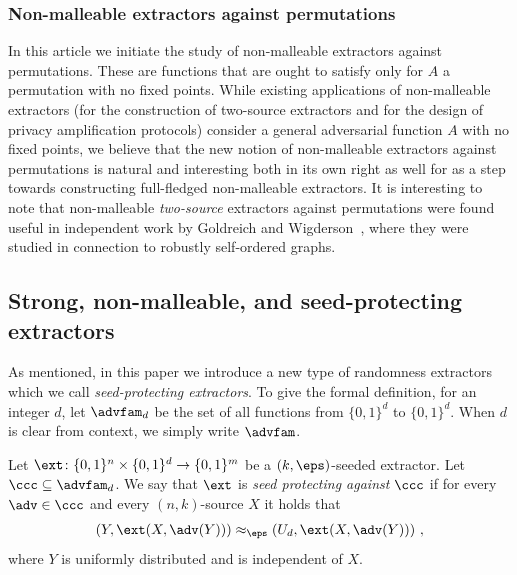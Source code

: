 %
%
\subsubsection{Non-malleable extractors against permutations}
%
In this %
article  %
we initiate the study of non-malleable extractors against permutations. These are functions that are ought to satisfy  only for  $A$ a permutation with no fixed points. While existing applications of non-malleable extractors (for the construction of %
two-source   %
extractors and for the design of privacy amplification protocols) consider a general adversarial function $A$ with no fixed points, we believe that the new notion of non-malleable extractors against permutations is natural and interesting both in its own right as well for as a step towards constructing full-fledged non-malleable extractors.
It is interesting to note that non-malleable \emph{two-source} extractors against permutations were found useful in
%
independent work  %
by Goldreich and Wigderson~\cite{GW21}, where they
were studied in connection to robustly self-ordered graphs.

\subsection{Strong, non-malleable, and seed-protecting extractors}\label{sec:snsp}
As mentioned, in this %
paper  %
we introduce a new type of randomness extractors which we call \emph{seed-protecting extractors}. To give the formal definition, for an integer $d$, let $\advfam_d$ be the set of all functions from $\{0,1\}^d$ to $\{0,1\}^d$. When $d$ is clear from context, we simply write $\advfam$.%

\begin{definition}\label{def:sp intro}
	Let $\ext \colon \{0,1\}^n \times \{0,1\}^d \to \{0,1\}^m$ be a $(k,\eps)$-seeded extractor. Let $\ccc \subseteq \advfam_d$. We say that $\ext$ is \emph{seed protecting against $\ccc$} if for every $\adv \in \ccc$ and every $(n,k)$-source $X$ it holds that
	\begin{equation}\label{eq:intro 123}
	\left(Y, \ext(X,\adv(Y))\right) \approx_\eps \left(U_d, \ext(X,\adv(Y))\right)\,,
	\end{equation}
	where $Y$ is uniformly distributed and is independent of $X$.
\end{definition}




